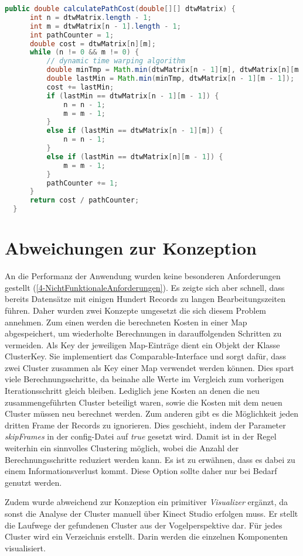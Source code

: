 \begin{lstfloat}
\begin{lstlisting}[language=Java, label={lst:DtwPath}, caption=DTW: Warping Path berechnen.]
  public double calculatePathCost(double[][] dtwMatrix) {
      int n = dtwMatrix.length - 1;
      int m = dtwMatrix[n - 1].length - 1;
      int pathCounter = 1;
      double cost = dtwMatrix[n][m];
      while (n != 0 && m != 0) {
          // dynamic time warping algorithm
          double minTmp = Math.min(dtwMatrix[n - 1][m], dtwMatrix[n][m - 1]);
          double lastMin = Math.min(minTmp, dtwMatrix[n - 1][m - 1]);
          cost += lastMin;
          if (lastMin == dtwMatrix[n - 1][m - 1]) {
              n = n - 1;
              m = m - 1;
          }
          else if (lastMin == dtwMatrix[n - 1][m]) {
              n = n - 1;
          }
          else if (lastMin == dtwMatrix[n][m - 1]) {
              m = m - 1;
          }
          pathCounter += 1;
      }
      return cost / pathCounter;
  }
\end{lstlisting}
\end{lstfloat}

\section{Abweichungen zur Konzeption}
\label{5-AbweichungenKonzeption}
An die Performanz der Anwendung wurden keine besonderen Anforderungen gestellt
(\autoref{4-NichtFunktionaleAnforderungen}).
Es zeigte sich aber schnell, dass bereits Datensätze mit einigen Hundert Records zu langen Bearbeitungszeiten führen.
Daher wurden zwei Konzepte umgesetzt die sich diesem Problem annehmen.
Zum einen werden die berechneten Kosten in einer Map abgespeichert,
um wiederholte Berechnungen in darauffolgenden Schritten zu vermeiden.
Als Key der jeweiligen Map-Einträge dient ein Objekt der Klasse ClusterKey.
Sie implementiert das Comparable-Interface und sorgt dafür,
dass zwei Cluster zusammen als Key einer Map verwendet werden können.
Dies spart viele Berechnungsschritte,
da beinahe alle Werte im Vergleich zum vorherigen Iterationsschritt gleich bleiben.
Lediglich jene Kosten an denen die neu zusammengeführten Cluster beteiligt waren,
sowie die Kosten mit dem neuen Cluster müssen neu berechnet werden.
Zum anderen gibt es die Möglichkeit jeden dritten Frame der Records zu ignorieren.
Dies geschieht, indem der Parameter \emph{skipFrames} in der config-Datei auf \emph{true} gesetzt wird.
Damit ist in der Regel weiterhin ein sinnvolles Clustering möglich,
wobei die Anzahl der Berechnungsschritte reduziert werden kann.
Es ist zu erwähnen, dass es dabei zu einem Informationsverlust kommt.
Diese Option sollte daher nur bei Bedarf genutzt werden.

Zudem wurde abweichend zur Konzeption ein primitiver \emph{Visualizer} ergänzt,
da sonst die Analyse der Cluster manuell über Kinect Studio erfolgen muss.
Er stellt die Laufwege der gefundenen Cluster aus der Vogelperspektive dar.
Für jedes Cluster wird ein Verzeichnis erstellt.
Darin werden die einzelnen Komponenten visualisiert.